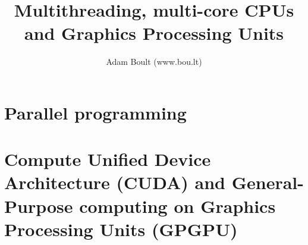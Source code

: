 \documentclass[oneside]{book}
\begin{document}
\author{Adam Boult (www.bou.lt)}
\title{Multithreading, multi-core CPUs and Graphics Processing Units}
\maketitle

\setcounter{tocdepth}{0}
\tableofcontents



\part{Parallel programming}


\part{Compute Unified Device Architecture (CUDA) and General-Purpose computing on Graphics Processing Units (GPGPU)}
\end{document}
